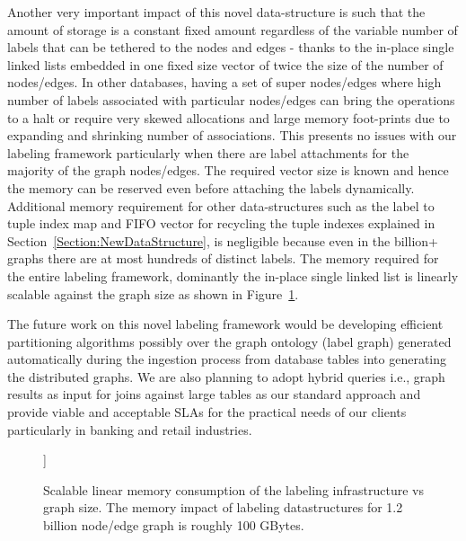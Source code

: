 \documentclass[preprint,3p,twocolumn]{elsarticle}
\begin{document}
Another very important impact of this novel data-structure is such that the amount of storage is a constant fixed amount regardless of the variable number of labels that can be tethered to the nodes and edges - thanks to the in-place single linked lists embedded in one fixed size vector of twice the size of the number of nodes/edges. In other databases, having a set of super nodes/edges where high number of labels associated with particular nodes/edges can bring the operations to a halt or require very skewed allocations and large memory foot-prints due to expanding and shrinking number of associations. This presents no issues with our labeling framework particularly when there are label attachments for the majority of the graph nodes/edges. The required vector size is known and hence the memory can be reserved even before attaching the labels dynamically. Additional memory requirement for other data-structures such as the label to tuple index map and FIFO vector for recycling the tuple indexes explained in Section~\ref{Section:NewDataStructure}, is negligible because even in the billion+ graphs there are at most hundreds of distinct labels. The memory required for the entire labeling framework,  dominantly the in-place single linked list is linearly scalable against the graph size as shown in Figure~\ref{Figure:memory}. 

The future work on this novel labeling framework would be developing efficient partitioning algorithms possibly over the graph ontology (label graph) generated automatically during the ingestion process from database tables into generating the distributed graphs. We are also planning to adopt hybrid queries i.e., graph results as input for joins against large tables as our standard approach and provide viable and acceptable SLAs for the practical needs of our clients particularly in banking and retail industries. 
 
\begin{figure}
\centering
\begin{bchart}[step=1,max=4,scale=0.7]]
\end{bchart}
 \caption{Scalable linear memory consumption of the labeling infrastructure vs graph size. The memory impact of labeling datastructures for 1.2 billion node/edge graph is roughly 100 GBytes.}
    \label{Figure:memory}
\end{figure}
\end{document}
